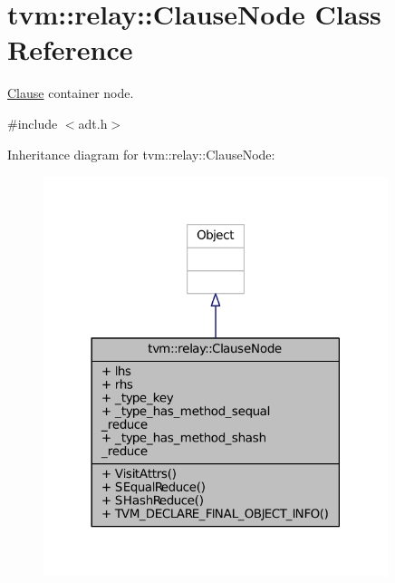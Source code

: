 \hypertarget{classtvm_1_1relay_1_1ClauseNode}{}\section{tvm\+:\+:relay\+:\+:Clause\+Node Class Reference}
\label{classtvm_1_1relay_1_1ClauseNode}


\hyperlink{classtvm_1_1relay_1_1Clause}{Clause} container node.  




{\ttfamily \#include $<$adt.\+h$>$}



Inheritance diagram for tvm\+:\+:relay\+:\+:Clause\+Node\+:
\nopagebreak
\begin{figure}[H]
\begin{center}
\leavevmode
\includegraphics[width=285pt]{classtvm_1_1relay_1_1ClauseNode__inherit__graph}
\end{center}
\end{figure}


